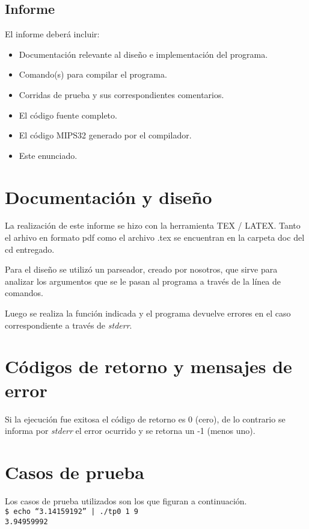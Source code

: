 \documentclass[a4paper,10pt]{article}
\begin{document}
\subsection{Informe}
El informe deber\'{a} incluir:

\begin{itemize}
\item Documentaci\'{o}n relevante al dise\~no e implementaci\'{o}n del programa.
\item Comando(s) para compilar el programa.
\item Corridas de prueba y sus correspondientes comentarios.
\item El c\'{o}digo fuente completo.
\item El c\'{o}digo MIPS32 generado por el compilador.
\item Este enunciado.
\end{itemize}

\section{Documentaci\'{o}n y dise\~no}
La realizaci\'{o}n  de este informe se hizo con la herramienta TEX / LATEX. Tanto el arhivo en formato pdf como el archivo .tex se encuentran en la carpeta doc del cd entregado.

Para el dise\~no se utiliz\'{o} un parseador, creado por nosotros, que sirve para analizar los argumentos que se le pasan al programa a trav\'{e}s de la l\'{i}nea de comandos.

Luego se realiza la funci\'{o}n indicada y el programa devuelve errores en el caso correspondiente a trav\'{e}s de \textit{stderr}.

\section{C\'{o}digos de retorno y mensajes de error}
Si la ejecuci\'{o}n fue exitosa el c\'{o}digo de retorno es 0 (cero), de lo contrario se informa por \textit{stderr} el error ocurrido y se retorna un -1 (menos uno).

\newpage
\newpage

\section{Casos de prueba}
Los casos de prueba utilizados son los que figuran a continuaci\'{o}n.\\

\indent\texttt{\$ echo ``3.14159192'' | ./tp0 1 9}\\
\indent\texttt{3.94959992}\\
\end{document}
